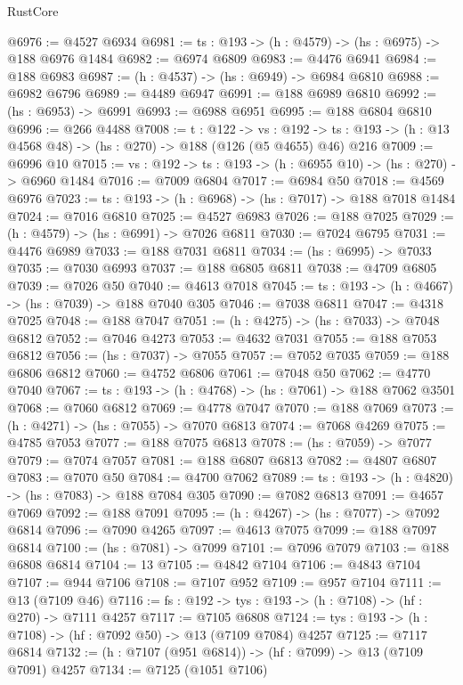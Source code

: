 \begin{lexlean}{RustCore}
\begin{coremodule}
@6976 := @4527 @6934
@6981 := {ts : @193} -> (h : @4579) -> (hs : @6975) -> @188 @6976 @1484
@6982 := @6974 @6809
@6983 := @4476 @6941
@6984 := @188 @6983
@6987 := (h : @4537) -> (hs : @6949) -> @6984 @6810
@6988 := @6982 @6796
@6989 := @4489 @6947
@6991 := @188 @6989 @6810
@6992 := (hs : @6953) -> @6991
@6993 := @6988 @6951
@6995 := @188 @6804 @6810
@6996 := @266 @4488
@7008 := {t : @122} ->
  {vs : @192} ->
  {ts : @193} -> (h : @13 @4568 @48) -> (hs : @270) -> @188 (@126 (@5 @4655) @46) @216
@7009 := @6996 @10
@7015 := {vs : @192} -> {ts : @193} -> (h : @6955 @10) -> (hs : @270) -> @6960 @1484
@7016 := @7009 @6804
@7017 := @6984 @50
@7018 := @4569 @6976
@7023 := {ts : @193} -> (h : @6968) -> (hs : @7017) -> @188 @7018 @1484
@7024 := @7016 @6810
@7025 := @4527 @6983
@7026 := @188 @7025
@7029 := (h : @4579) -> (hs : @6991) -> @7026 @6811
@7030 := @7024 @6795
@7031 := @4476 @6989
@7033 := @188 @7031 @6811
@7034 := (hs : @6995) -> @7033
@7035 := @7030 @6993
@7037 := @188 @6805 @6811
@7038 := @4709 @6805
@7039 := @7026 @50
@7040 := @4613 @7018
@7045 := {ts : @193} -> (h : @4667) -> (hs : @7039) -> @188 @7040 @305
@7046 := @7038 @6811
@7047 := @4318 @7025
@7048 := @188 @7047
@7051 := (h : @4275) -> (hs : @7033) -> @7048 @6812
@7052 := @7046 @4273
@7053 := @4632 @7031
@7055 := @188 @7053 @6812
@7056 := (hs : @7037) -> @7055
@7057 := @7052 @7035
@7059 := @188 @6806 @6812
@7060 := @4752 @6806
@7061 := @7048 @50
@7062 := @4770 @7040
@7067 := {ts : @193} -> (h : @4768) -> (hs : @7061) -> @188 @7062 @3501
@7068 := @7060 @6812
@7069 := @4778 @7047
@7070 := @188 @7069
@7073 := (h : @4271) -> (hs : @7055) -> @7070 @6813
@7074 := @7068 @4269
@7075 := @4785 @7053
@7077 := @188 @7075 @6813
@7078 := (hs : @7059) -> @7077
@7079 := @7074 @7057
@7081 := @188 @6807 @6813
@7082 := @4807 @6807
@7083 := @7070 @50
@7084 := @4700 @7062
@7089 := {ts : @193} -> (h : @4820) -> (hs : @7083) -> @188 @7084 @305
@7090 := @7082 @6813
@7091 := @4657 @7069
@7092 := @188 @7091
@7095 := (h : @4267) -> (hs : @7077) -> @7092 @6814
@7096 := @7090 @4265
@7097 := @4613 @7075
@7099 := @188 @7097 @6814
@7100 := (hs : @7081) -> @7099
@7101 := @7096 @7079
@7103 := @188 @6808 @6814
@7104 := 13
@7105 := @4842 @7104
@7106 := @4843 @7104
@7107 := @944 @7106
@7108 := @7107 @952
@7109 := @957 @7104
@7111 := @13 (@7109 @46)
@7116 := {fs : @192} -> {tys : @193} -> (h : @7108) -> (hf : @270) -> @7111 @4257
@7117 := @7105 @6808
@7124 := {tys : @193} -> (h : @7108) -> (hf : @7092 @50) -> @13 (@7109 @7084) @4257
@7125 := @7117 @6814
@7132 := (h : @7107 (@951 @6814)) -> (hf : @7099) -> @13 (@7109 @7091) @4257
@7134 := @7125 (@1051 @7106)

\end{coremodule}
\end{lexlean}
